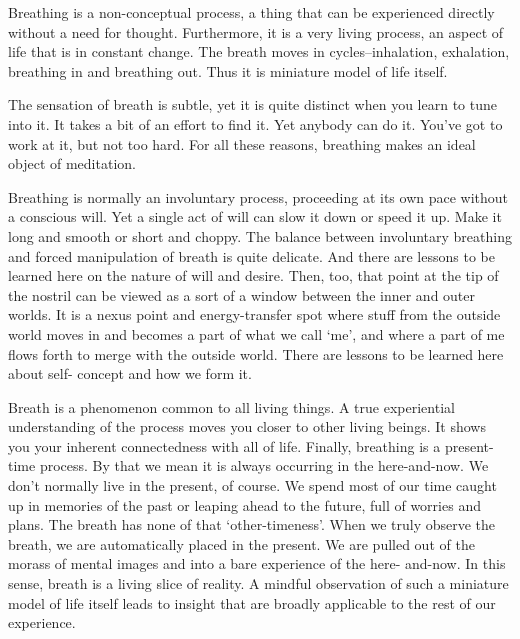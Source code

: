 Breathing is a non-conceptual process, a thing that can be experienced directly
without a need for thought. Furthermore, it is a very living process, an aspect
of life that is in constant change. The breath moves in cycles--inhalation,
exhalation, breathing in and breathing out. Thus it is miniature model of life
itself.

The sensation of breath is subtle, yet it is quite distinct when you learn to
tune into it. It takes a bit of an effort to find it. Yet anybody can do it.
You've got to work at it, but not too hard. For all these reasons, breathing
makes an ideal object of meditation.

Breathing is normally an involuntary process, proceeding at its own pace without
a conscious will. Yet a single act of will can slow it down or speed it up. Make
it long and smooth or short and choppy. The balance between involuntary
breathing and forced manipulation of breath is quite delicate. And there are
lessons to be learned here on the nature of will and desire. Then, too, that
point at the tip of the nostril can be viewed as a sort of a window between the
inner and outer worlds. It is a nexus point and energy-transfer spot where stuff
from the outside world moves in and becomes a part of what we call `me', and
where a part of me flows forth to merge with the outside world. There are
lessons to be learned here about self- concept and how we form it.

Breath is a phenomenon common to all living things. A true experiential
understanding of the process moves you closer to other living beings. It shows
you your inherent connectedness with all of life. Finally, breathing is a
present-time process. By that we mean it is always occurring in the
here-and-now. We don't normally live in the present, of course. We spend most of
our time caught up in memories of the past or leaping ahead to the future, full
of worries and plans. The breath has none of that `other-timeness'. When we
truly observe the breath, we are automatically placed in the present. We are
pulled out of the morass of mental images and into a bare experience of the
here- and-now. In this sense, breath is a living slice of reality. A mindful
observation of such a miniature model of life itself leads to insight that are
broadly applicable to the rest of our experience.

